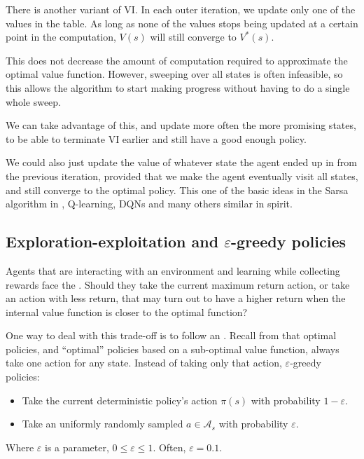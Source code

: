 \citep[Section~4.4]{sutton1998introduction}

There is another variant of \acl{VI}. In each outer iteration, we update only
one of the values in the table. As long as none of the values stops being
updated at a certain point in the computation, $V(s)$ will still converge to $V^*(s)$.

This does not decrease the amount of computation required to approximate the
optimal value function. However, sweeping over all states is often infeasible,
so this allows the algorithm to start making progress without having to do a
single whole sweep.

We can take advantage of this, and update more often the more promising states,
to be able to terminate \acl{VI} earlier and still have a good enough policy.
\citep[Section~4.5]{sutton1998introduction}

 We could also just update the value of whatever state the agent ended up in
from the previous iteration, provided that we make the agent eventually visit
all states, and still converge to the optimal policy. This one of the basic
ideas in the Sarsa algorithm in , Q-learning,
\aclp{DQN} and many others similar in spirit.

\subsection{Exploration-exploitation and \texorpdfstring{$\varepsilon$}{ε}-greedy policies}
Agents that are interacting with an environment and learning while collecting
rewards face the . Should they take the
current maximum return action, or take an action with less return, that may turn
out to have a higher return when the internal value function is closer to the
optimal function?

One way to deal with this trade-off is to follow an
.
Recall from  that optimal policies,
and ``optimal'' policies based on a sub-optimal value function, always take one
action for any state. Instead of taking only that action, $\varepsilon$-greedy
policies:
\begin{itemize}
\item Take the current deterministic policy's action $\pi(s)$ with probability
$1-\varepsilon$.
\item Take an uniformly randomly sampled $a\in\mathcal{A}_s$ with probability
$\varepsilon$.
\end{itemize}
Where $\varepsilon$ is a parameter, $0\leq\varepsilon\leq 1$. Often,
$\varepsilon=0.1$.

